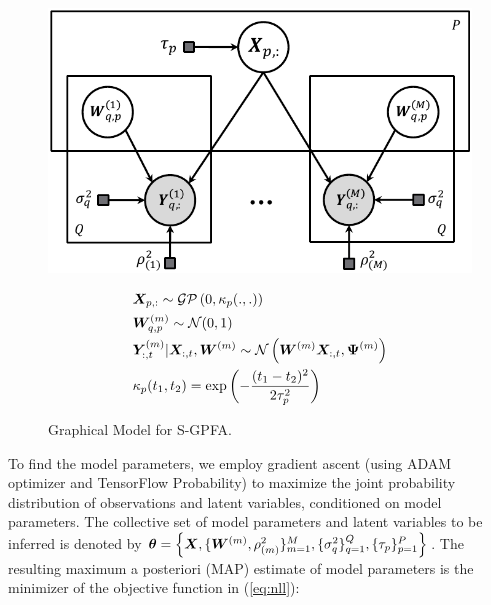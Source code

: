 
\begin{figure}[t]
    \begin{minipage}{.5\textwidth}
        \centering
        \includegraphics[width=.8\linewidth]{figures/ch1/unfold_M.pdf}
        \caption{\footnotesize Graphical Model for S-GPFA.} \label{fig:model}
    \end{minipage}
    \begin{minipage}[c]{.5\textwidth}
        \savebox\strutbox{$\vphantom{\dfrac11}$}
        \begin{align*}
            & \bm{X}_{p, :} \sim \mathcal{GP}\left(0, \kappa_p(.,.) \right) \\
            & \bm{W}^{(m)}_{q,p} \sim \mathcal{N}(0, 1) \\
            & \bm{Y}^{(m)}_{:, t} | \bm{X}_{:, t}, \bm{W}^{(m)} \sim \mathcal{N} \left( \bm{W}^{(m)} \bm{X}_{:, t}, \bm{\Psi}^{(m)} \right) \\
            & \kappa_p(t_1, t_2) = \exp \left( -\frac{(t_1 - t_2)^2}{2\tau_p^2} \right)
        \end{align*}
  \end{minipage}
    \vspace{-1em}
\end{figure}

\sloppy To find the model parameters, we employ gradient ascent (using ADAM optimizer \cite{adam} and TensorFlow Probability) to maximize the joint probability distribution of observations and latent variables, conditioned on model parameters. The collective set of model parameters and latent variables to be inferred is denoted by $\bm{\theta}=\Bigl\{ \bm{X}, \{\bm{W}^{(m)}, \rho_{(m)}^2\}_{m=1}^M, \{\sigma_{q}^2\}_{q=1}^Q, \{\tau_p\}_{p=1}^P \Bigr\}$. The resulting maximum a posteriori (MAP) estimate of model parameters is the minimizer of the objective function in (\ref{eq:nll}):

